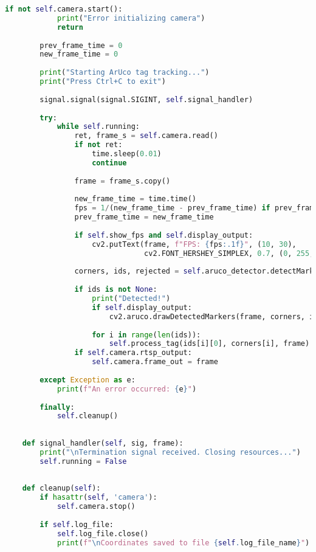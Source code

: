 \begin{lstlisting}[language=Python]
        if not self.camera.start():
            print("Error initializing camera")
            return
    
        prev_frame_time = 0
        new_frame_time = 0
    
        print("Starting ArUco tag tracking...")
        print("Press Ctrl+C to exit")
    
        signal.signal(signal.SIGINT, self.signal_handler)
    
        try:
            while self.running:
                ret, frame_s = self.camera.read()
                if not ret:
                    time.sleep(0.01)
                    continue
    
                frame = frame_s.copy()
    
                new_frame_time = time.time()
                fps = 1/(new_frame_time - prev_frame_time) if prev_frame_time > 0 else 0
                prev_frame_time = new_frame_time
    
                if self.show_fps and self.display_output:
                    cv2.putText(frame, f"FPS: {fps:.1f}", (10, 30),
                                cv2.FONT_HERSHEY_SIMPLEX, 0.7, (0, 255, 0), 2)
    
                corners, ids, rejected = self.aruco_detector.detectMarkers(frame)
    
                if ids is not None:
                    print("Detected!")
                    if self.display_output:
                        cv2.aruco.drawDetectedMarkers(frame, corners, ids)
    
                    for i in range(len(ids)):
                        self.process_tag(ids[i][0], corners[i], frame)
                if self.camera.rtsp_output:
                    self.camera.frame_out = frame
    
        except Exception as e:
            print(f"An error occurred: {e}")
    
        finally:
            self.cleanup()
    
        
    def signal_handler(self, sig, frame):
        print("\nTermination signal received. Closing resources...")
        self.running = False
    
    
    def cleanup(self):
        if hasattr(self, 'camera'):
            self.camera.stop()
    
        if self.log_file:
            self.log_file.close()
            print(f"\nCoordinates saved to file {self.log_file_name}")
    

\end{lstlisting}
